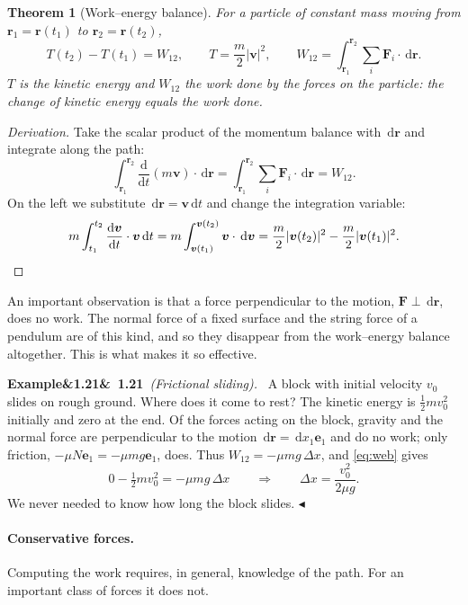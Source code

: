 \documentclass[11pt,a4paper,oneside]{report}
\numberwithin{equation}{chapter}
\newcommand{\vect}[1]{\bm{#1}}
\newcommand{\e}[1]{\vect{e}_{#1}}
\newcommand{\dd}{\,\mathrm{d}}
\newcommand{\dv}[2]{\frac{\mathrm{d}#1}{\mathrm{d}#2}}
\theoremstyle{plain}
\newtheorem{theorem}{Theorem}[chapter]
\theoremstyle{definition}
\theoremstyle{remark}
\newenvironment{example}[2]{%
  \par\addvspace{\bigskipamount}\noindent
  \textbf{Example\ifx&#1&\else~#1\fi}\ \textit{(#2).}\ \ignorespaces}%
  {\hfill$\blacktriangleleft$\par\addvspace{\bigskipamount}}
\begin{document}
\begin{theorem}[Work--energy balance]
For a particle of constant mass moving from $\vect r_1=\vect r(t_1)$ to $\vect r_2=\vect r(t_2)$,
\begin{equation}\label{eq:web}
  T(t_2)-T(t_1)=W_{12},\qquad T=\frac m2|\vect v|^2,\qquad W_{12}=\int_{\vect r_1}^{\vect r_2}\sum_i\vect F_i\cdot\dd\vect r .
\end{equation}
$T$ is the \emph{kinetic energy} and $W_{12}$ the \emph{work} done by the forces on the particle: the change of
kinetic energy equals the work done.
\end{theorem}
\begin{proof}[Derivation]
Take the scalar product of the momentum balance with $\dd\vect r$ and integrate along the path:
\[
  \int_{\vect r_1}^{\vect r_2}\dv{}{t}(m\vect v)\cdot\dd\vect r=\int_{\vect r_1}^{\vect r_2}\sum_i\vect F_i\cdot\dd\vect r=W_{12}.
\]
On the left we substitute $\dd\vect r=\vect v\dd t$ and change the integration variable:
\[
  m\int_{t_1}^{t_2}\dv{\vect v}{t}\cdot\vect v\dd t=m\int_{\vect v(t_1)}^{\vect v(t_2)}\vect v\cdot\dd\vect v
  =\frac m2|\vect v(t_2)|^2-\frac m2|\vect v(t_1)|^2 .\qedhere
\]
\end{proof}

An important observation is that a force perpendicular to the motion, $\vect F\perp\dd\vect r$, does no work. The
normal force of a fixed surface and the string force of a pendulum are of this kind, and so they disappear from the
work--energy balance altogether. This is what makes it so effective.

\begin{example}{1.21}{Frictional sliding}
A block with initial velocity $v_0$ slides on rough ground. Where does it come to rest? The kinetic energy is
$\frac12mv_0^2$ initially and zero at the end. Of the forces acting on the block, gravity and the normal force
are perpendicular to the motion $\dd\vect r=\dd x_1\e1$ and do no work; only friction, $-\mu N\e1=-\mu mg\e1$, does.
Thus $W_{12}=-\mu mg\,\Delta x$, and \eqref{eq:web} gives
\[
  0-\tfrac12mv_0^2=-\mu mg\,\Delta x\qquad\Longrightarrow\qquad\Delta x=\frac{v_0^2}{2\mu g}.
\]
We never needed to know how long the block slides.
\end{example}

\paragraph{Conservative forces.}
Computing the work requires, in general, knowledge of the path. For an important class of forces it does not.
\end{document}
